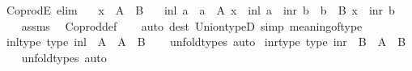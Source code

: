 \begin{isabellebody}
\isamarkupfalse%
\ CoprodE\ {\isacharbrackleft}{\kern0pt}elim{\isacharbrackright}{\kern0pt}{\isacharcolon}{\kern0pt}\isanewline
\ \ \ {\isachardoublequoteopen}x\ {\isacharcolon}{\kern0pt}\ A\ {\isasymCoprod}\ B{\isachardoublequoteclose}\isanewline
\ \ \ {\isacharparenleft}{\kern0pt}inl{\isacharparenright}{\kern0pt}\ a\ \ {\isachardoublequoteopen}a\ {\isacharcolon}{\kern0pt}\ A{\isachardoublequoteclose}\ {\isachardoublequoteopen}x\ {\isacharequal}{\kern0pt}\ inl\ a{\isachardoublequoteclose}\ {\isacharbar}{\kern0pt}\ {\isacharparenleft}{\kern0pt}inr{\isacharparenright}{\kern0pt}\ b\ \ {\isachardoublequoteopen}b\ {\isacharcolon}{\kern0pt}\ B{\isachardoublequoteclose}\ {\isachardoublequoteopen}x\ {\isacharequal}{\kern0pt}\ inr\ b{\isachardoublequoteclose}\isanewline
%
\isadelimproof
\ \ %
\endisadelimproof
%
\isatagproof
{}\isamarkupfalse%
\ assms\ \isamarkupfalse%
\ Coprod{\isacharunderscore}{\kern0pt}def\isanewline
\ \ \isamarkupfalse%
\ {\isacharparenleft}{\kern0pt}auto\ dest{\isacharbang}{\kern0pt}{\isacharcolon}{\kern0pt}\ Union{\isacharunderscore}{\kern0pt}typeD\ simp{\isacharcolon}{\kern0pt}\ meaning{\isacharunderscore}{\kern0pt}of{\isacharunderscore}{\kern0pt}type{\isacharparenright}{\kern0pt}%
\endisatagproof
{\isafoldproof}%
%
\isadelimproof
\isanewline
%
\endisadelimproof
\isanewline
{}\isamarkupfalse%
\ inl{\isacharunderscore}{\kern0pt}type\ {\isacharbrackleft}{\kern0pt}type{\isacharbrackright}{\kern0pt}{\isacharcolon}{\kern0pt}\ {\isachardoublequoteopen}inl\ {\isacharcolon}{\kern0pt}\ A\ {\isasymRightarrow}\ {\isacharparenleft}{\kern0pt}A\ {\isasymCoprod}\ B{\isacharparenright}{\kern0pt}{\isachardoublequoteclose}\isanewline
%
\isadelimproof
\ \ %
\endisadelimproof
%
\isatagproof
{}\isamarkupfalse%
\ unfold{\isacharunderscore}{\kern0pt}types\ auto%
\endisatagproof
{\isafoldproof}%
%
\isadelimproof
\isanewline
%
\endisadelimproof
\isanewline
{}\isamarkupfalse%
\ inr{\isacharunderscore}{\kern0pt}type\ {\isacharbrackleft}{\kern0pt}type{\isacharbrackright}{\kern0pt}{\isacharcolon}{\kern0pt}\ {\isachardoublequoteopen}inr\ {\isacharcolon}{\kern0pt}\ B\ {\isasymRightarrow}\ {\isacharparenleft}{\kern0pt}A\ {\isasymCoprod}\ B{\isacharparenright}{\kern0pt}{\isachardoublequoteclose}\isanewline
%
\isadelimproof
\ \ %
\endisadelimproof
%
\isatagproof
{}\isamarkupfalse%
\ unfold{\isacharunderscore}{\kern0pt}types\ auto%
\endisatagproof
{\isafoldproof}%
%
\isadelimproof

\end{isabellebody}
